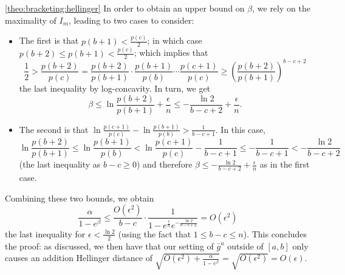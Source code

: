 \documentclass[11pt]{article}
\theoremstyle{definition}
\newcommand{\eps}{\epsilon}
\begin{document}
\begin{proofof}{\cref{theo:bracketing:hellinger}}
\noindent In order to obtain an upper bound on $\beta$, we rely on the maximality of $I_m$, leading to two cases to consider:
\begin{itemize}
  \item The first is that $p(b+1) < \frac{p(c)}{2}$; in which case $p(b+2) \leq p(b+1) < \frac{p(c)}{2}$; which implies that
\[
    \frac{1}{2} > \frac{p(b+2)}{p(c)} = \frac{p(b+2)}{p(b+1)}\cdot\frac{p(b+1)}{p(b)}\cdots\frac{p(c+1)}{p(c)} \geq \left(\frac{p(b+2)}{p(b+1)}\right)^{b-c+2}
\]
the last inequality by log-concavity. In turn, we get
\[
    \beta \leq \ln\frac{p(b+2)}{p(b+1)} + \frac{\eps}{n} \leq -\frac{\ln 2}{b-c+2}+ \frac{\eps}{n}.
\]
  \item The second is that $\ln\frac{p(c+1)}{p(c)} - \ln\frac{p(b+1)}{p(b)} > \frac{1}{b-c+1}$. In this case,
  \[
      \ln \frac{p(b+2)}{p(b+1)} \leq \ln \frac{p(b+1)}{p(b)} < \ln\frac{p(c+1)}{p(c)} - \frac{1}{b-c+1} \leq - \frac{1}{b-c+1} < -\frac{\ln 2}{b-c+2}
  \]
  (the last inequality as $b-c \geq 0$) and therefore $\beta\leq -\frac{\ln 2}{b-c+2}+ \frac{\eps}{n}$ as in the first case.
\end{itemize}
Combining these two bounds, we obtain
\[
    \frac{\alpha}{1-e^\beta} \leq \frac{O(\eps^2)}{b-c} \cdot \frac{1}{1-e^{\frac{\eps}{n}}e^{-\frac{\ln 2}{b-c+2}}} = O(\eps^2)
\]
the last inequality for $\eps < \frac{\ln 2}{2}$ (using the fact that $1\leq b-c\leq n$). This concludes the proof: as discussed, we then have that our setting of $\bar{g}^u$ outside of $[a,b]$ only causes an addition Hellinger distance of $\sqrt{O(\eps^2)+\frac{\alpha}{1-e^\beta}} = \sqrt{O(\eps^2)}=O(\eps)$.

\end{proofof}
\end{document}
